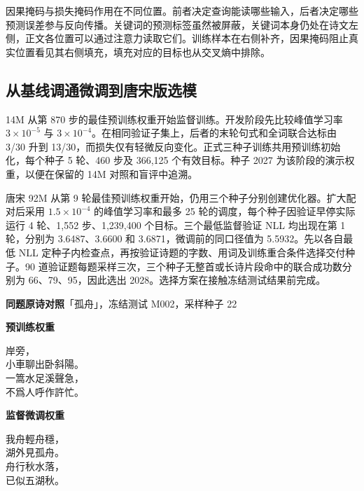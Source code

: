 
因果掩码与损失掩码作用在不同位置。前者决定查询能读哪些输入，后者决定哪些预测误差参与反向传播。关键词的预测标签虽然被屏蔽，关键词本身仍处在诗文左侧，正文各位置可以通过注意力读取它们。训练样本在右侧补齐，因果掩码阻止真实位置看见其右侧填充，填充对应的目标也从交叉熵中排除。

\subsection{从基线调通微调到唐宋版选模}

14M 从第 870 步的最佳预训练权重开始监督训练。开发阶段先比较峰值学习率 $3\times10^{-5}$ 与 $3\times10^{-4}$。在相同验证子集上，后者的末轮句式和全词联合达标由 3/30 升到 13/30，而损失仅有轻微反向变化。正式三种子训练共用预训练初始化，每个种子 5 轮、460 步及 366,125 个有效目标。种子 2027 为该阶段的演示权重，以便在保留的 14M 对照和盲评中追溯。

唐宋 92M 从第 9 轮最佳预训练权重开始，仍用三个种子分别创建优化器。扩大配对后采用 $1.5\times10^{-4}$ 的峰值学习率和最多 25 轮的调度，每个种子因验证早停实际运行 4 轮、1,552 步、1,239,400 个目标。三个最低监督验证 NLL 均出现在第 1 轮，分别为 3.6487、3.6600 和 3.6871，微调前的同口径值为 5.5932。先以各自最低 NLL 定种子内检查点，再按验证诗题的字数、用词及训练重合条件选择交付种子。90 道验证题每题采样三次，三个种子无整首或长诗片段命中的联合成功数分别为 66、79、95，因此选出 2028。选择方案在接触冻结测试结果前完成。

\begin{poembox}
\small\noindent\textbf{同题原诗对照}\quad 「孤舟」，冻结测试 M002，采样种子 22\par
\smallskip
\noindent\begin{minipage}[t]{.48\linewidth}
\raggedright\textbf{预训练权重}\par
{\versefont 岸旁，\\小車聊出卧斜陽。\\一篙水足溪聲急，\\不爲人呼作許忙。}
\end{minipage}\hfill
\begin{minipage}[t]{.48\linewidth}
\raggedright\textbf{监督微调权重}\par
{\versefont 我舟輕舟穩，\\湖外見孤舟。\\舟行秋水落，\\已似五湖秋。}
\end{minipage}
\end{poembox}

